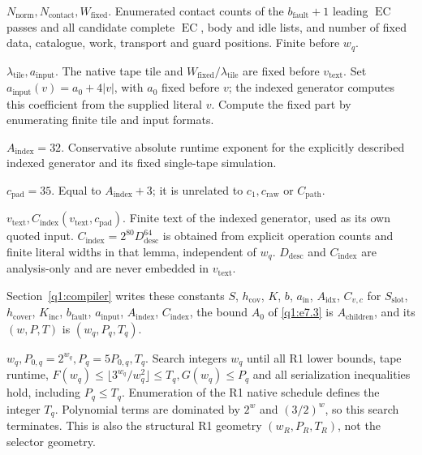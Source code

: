 \noindent\textbf{\(N_{\mathrm{norm}},N_{\mathrm{contact}},W_{\mathrm{fixed}}\)}. Enumerated contact counts of the \(b_{\mathrm{fault}}+1\) leading \(\operatorname{EC}\) passes and all candidate complete \(\operatorname{EC}\), body and idle lists, and number of fixed data, catalogue, work, transport and guard positions. Finite before \(w_{q}\).\par\smallskip
\noindent\textbf{\(\lambda_{\mathrm{tile}},a_{\mathrm{input}}\)}. The native tape tile and \(W_{\mathrm{fixed}}/\lambda_{\mathrm{tile}}\) are fixed before \(v_{\mathrm{text}}\). Set \(a_{\mathrm{input}}(v)=a_{0}+4|v|\), with \(a_{0}\) fixed before \(v\); the indexed generator computes this coefficient from the supplied literal \(v\). Compute the fixed part by enumerating finite tile and input formats.\par\smallskip
\noindent\textbf{\(A_{\mathrm{index}}=32\)}. Conservative absolute runtime exponent for the explicitly described indexed generator and its fixed single-tape simulation.\par\smallskip
\noindent\textbf{\(c_{\mathrm{pad}}=35\)}. Equal to \(A_{\mathrm{index}}+3\); it is unrelated to \(c_{1}, c_{\mathrm{raw}}\) or \(C_{\mathrm{path}}\).\par\smallskip
\noindent\textbf{\(v_{\mathrm{text}},C_{\mathrm{index}}(v_{\mathrm{text}},c_{\mathrm{pad}})\)}. Finite text of the indexed generator, used as its own quoted input. \(C_{\mathrm{index}}=2^{80} D_{\mathrm{desc}}^{64}\) is obtained from explicit operation counts and finite literal widths in that lemma, independent of \(w_{q}\). \(D_{\mathrm{desc}}\) and \(C_{\mathrm{index}}\) are analysis-only and are never embedded in \(v_{\mathrm{text}}\).\par\smallskip
Section~\ref{q1:compiler} writes these constants \(S\), \(h_{\mathrm{cov}}\), \(K\), \(b\), \(a_{\mathrm{in}}\), \(A_{\mathrm{idx}}\), \(C_{v,c}\) for \(S_{\mathrm{slot}}\), \(h_{\mathrm{cover}}\), \(K_{\mathrm{inc}}\), \(b_{\mathrm{fault}}\), \(a_{\mathrm{input}}\), \(A_{\mathrm{index}}\), \(C_{\mathrm{index}}\), the bound \(A_{0}\) of \eqref{q1:e7.3} is \(A_{\mathrm{children}}\), and its \((w,P,T)\) is \((w_{q},P_{q},T_{q})\).\par\smallskip
\noindent\textbf{\(w_{q},P_{0,q}=2^{w_{q}},P_{q}=5P_{0,q},T_{q}\)}. Search integers \(w_{q}\) until all R1 lower bounds, tape runtime, \(F(w_{q})\le \lfloor 3^{w_{q}}/w_{q}^{2}\rfloor\le T_{q}, G(w_{q})\le P_{q}\) and all serialization inequalities hold, including \(P_q\le T_q\). Enumeration of the R1 native schedule defines the integer \(T_{q}\). Polynomial terms are dominated by \(2^{w}\) and \((3/2)^{w}\), so this search terminates. This is also the structural R1 geometry \((w_{R},P_{R},T_{R})\), not the selector geometry.\par\smallskip
